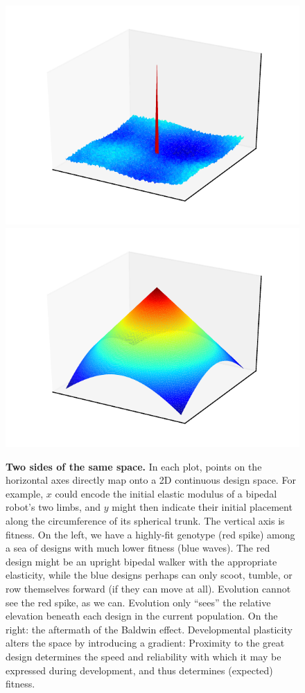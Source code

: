 \begin{figure}[t]
\centering
\includegraphics[trim={40pt 20pt 30pt 25pt},clip,width=0.49\linewidth]{fig/baldwin_rugged.pdf}
\includegraphics[trim={40pt 20pt 30pt 25pt},clip,width=0.49\linewidth]{fig/baldwin_smooth.pdf}
\caption{\label{fig:baldwin3d}\textbf{Two sides of the same space.} 
In each plot, points on the horizontal axes directly map onto a 2D continuous design space.
For example, $x$ could encode the initial elastic modulus of a bipedal robot's two limbs, and $y$ might then indicate their initial placement along the circumference of its spherical trunk.
The vertical axis is fitness.
On the left, we have a highly-fit genotype (red spike) among a sea of designs with much lower fitness (blue waves).
The red design might be an upright bipedal walker with the appropriate elasticity,
while the blue designs perhaps can only scoot, tumble, or row themselves forward (if they can move at all).
Evolution cannot see the red spike, as we can.
Evolution only ``sees'' the relative elevation beneath each design in the current population.
On the right: the aftermath of the Baldwin effect.
Developmental plasticity alters the space by introducing a gradient: 
Proximity to the great design determines the speed and reliability with which it may be expressed during development, and thus determines (expected) fitness.
}
\end{figure}

